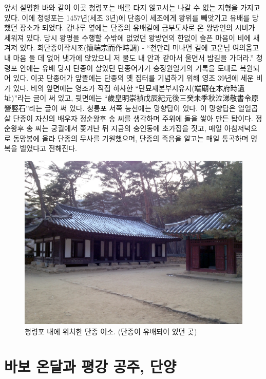 앞서 설명한 바와 같이 이곳 청령포는 배를 타지 않고서는 나갈 수 없는 지형을 가지고 있다. 
이에 청령포는 1457년(세조 3년)에 단종이 세조에게 왕위를 빼앗기고 유배를 당했던 장소가 되었다. 
강나루 옆에는 단종의 유배길에 금부도사로 온 왕방연의 시비가 세워져 있다. 
당시 왕명을 수행할 수밖에 없었던 왕방연의 한없이 슬픈 마음이 비에 새겨져 있다. 
회단종이작시조(懷端宗而作時調) - ``천만리 머나먼 길에 고운님 여의옵고 내 마음 둘 데 없어 냇가에 앉았으니 저 물도 내 안과 같아서 울면서 밤길을 가더라.''
청령포 안에는 유배 당시 단종이 살았던 단종어가가 승정원일기의 기록을 토대로 복원되어 있다. 
이곳 단종어가 앞뜰에는 단종의 옛 집터를 기념하기 위해 영조 39년에 세운 비가 있다. 
비의 앞면에는 영조가 직접 하사한 ``단묘재본부시유지(端廟在本府時遺址)''라는 글이 써 있고, 
뒷면에는 ``歲皇明崇禎戊辰紀元後三癸未季秋泣涕敬書令原營竪石''라는 글이 써 있다. 
청룡포 서쪽 능선에는 망향탑이 있다. 이 망향탑은 열일곱 살 단종이 자신의 배우자 정순왕후 송 씨를 생각하며 주위에 돌을 쌓아 만든 탑이다. 
정순왕후 송 씨는 궁궐에서 쫓겨난 뒤 지금의 숭인동에 초가집을 짓고, 매일 아침저녁으로 동망봉에 올라 단종의 무사를 기원했으며, 
단종의 죽음을 알고는 매일 통곡하며 명복을 빌었다고 전해진다. 

\begin{figure}[ht]
    \centering
    \includegraphics[width=.6\textwidth]{s_img/청령포_사진_2.JPG}
    \caption{청령포 내에 위치한 단종 어소. (단종이 유배되어 있던 곳) \protect\footnotemark}
    \label{fig:my_label_s31}
\end{figure}


\section{바보 온달과 평강 공주, 단양}
